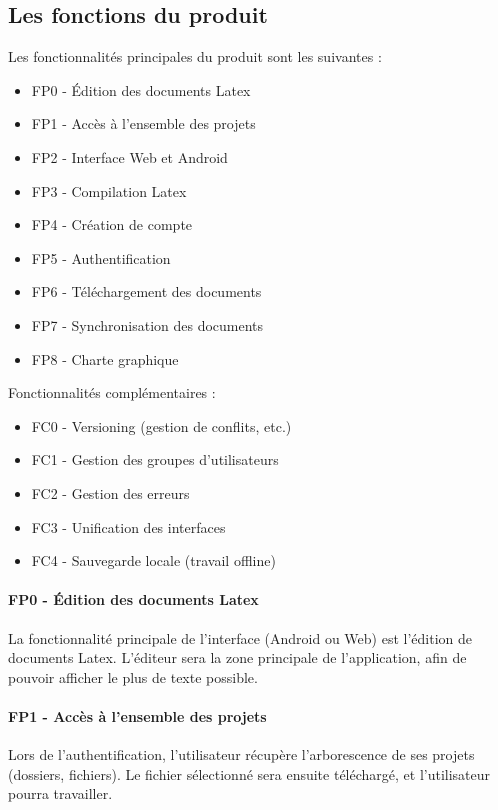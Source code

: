 \documentclass[a4paper,12pt]{article}
\begin{document}
\subsection{Les fonctions du produit}
 	
Les fonctionnalités principales du produit sont les suivantes :\\

\begin{itemize}
 \item FP0 - \'Edition des documents Latex
 \item FP1 - Accès à l'ensemble des projets
 \item FP2 - Interface Web et Android
 \item FP3 - Compilation Latex
 \item FP4 - Création de compte
 \item FP5 - Authentification
 \item FP6 - Téléchargement des documents
 \item FP7 - Synchronisation des documents
 \item FP8 - Charte graphique
\end{itemize}
\bigskip
Fonctionnalités complémentaires :\\
\begin{itemize}
 \item FC0 - Versioning (gestion de conflits, etc.)
 \item FC1 - Gestion des groupes d'utilisateurs
 \item FC2 - Gestion des erreurs
 \item FC3 - Unification des interfaces
 \item FC4 - Sauvegarde locale (travail offline)
\end{itemize}

\paragraph{FP0 - \'Edition des documents Latex\\}
La fonctionnalité principale de l'interface (Android ou Web) est l'édition de documents Latex. 
L'éditeur sera la zone principale de l'application, afin de pouvoir afficher le plus de texte 
possible.

\paragraph{FP1 - Accès à l'ensemble des projets\\}
Lors de l'authentification, l'utilisateur récupère l'arborescence de ses projets (dossiers, 
fichiers). Le fichier sélectionné sera ensuite téléchargé, et l'utilisateur pourra travailler.
\end{document}
